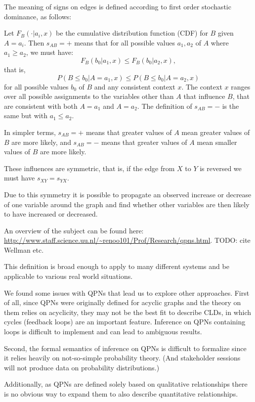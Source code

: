 \documentclass[a4paper,11pt]{article}
\begin{document}
The meaning of signs on edges is defined according to first order
stochastic dominance, as follows:

Let $F_B(\cdot|a_i, x)$ be the cumulative distribution function (CDF) for
$B$ given $A=a_i$. Then $s_{AB}=+$ means that for all possible values
$a_1,a_2$ of $A$ where $a_1\geq a_2$, we must have:
\[F_B(b_0|a_1, x)\leq F_B(b_0|a_2, x),\]
that is,
\[P(B \leq b_0| A = a_1, x)\leq P(B\leq b_0| A = a_2, x)\]
for all possible values $b_0$ of $B$ and any consistent context $x$.
The context $x$ ranges over all possible assignments to the
variables other than $A$ that influence $B$, that are consistent with both
$A=a_1$ and $A=a_2$.
%
The definition of $s_{AB}=-$ is the same but with $a_1\leq a_2$.

In simpler terms, $s_{AB} = +$ means that greater values of $A$ mean
greater values of $B$ are more likely, and $s_{AB}=-$ means that
greater values of $A$ mean smaller values of $B$ are more likely.

These influences are symmetric, that is, if the edge from $X$ to $Y$ is reversed
we must have $s_{XY} = s_{YX}$.

%
Due to this symmetry it is possible to propagate an observed increase
or decrease of one variable around the graph and find whether other
variables are then likely to have increased or decreased.

An overview of the subject can be found here:
\url{http://www.staff.science.uu.nl/~renoo101/Prof/Research/qpns.html}.
TODO: cite Wellman etc.

This definition is broad enough to
apply to many different systems and
be applicable to various real world situations.

We found some issues with QPNs that lead us to explore other
approaches.
%
First of all, since QPNs were originally defined for acyclic graphs
and the theory on them relies on acyclicity, they may not be the best
fit to describe CLDs, in which cycles (feedback loops) are an important
feature.
%
Inference on QPNs containing loops is difficult to implement and can
lead to ambiguous results.

Second, the formal semantics of inference on QPNs is difficult to
formalize since it relies heavily on not-so-simple probability theory.
%
(And stakeholder sessions will not produce data on probability
distributions.)

Additionally, as QPNs are defined solely based on qualitative
relationships there is no obvious way to expand them to also describe
quantitative relationships.
\end{document}
